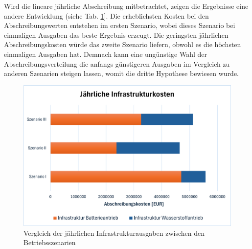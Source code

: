 Wird die lineare jährliche Abschreibung mitbetrachtet, 
zeigen die Ergebnisse eine andere Entwicklung (siehe Tab. \ref{res_abschr_betriebsszenarien}]. 
Die erheblichsten Kosten bei den Abschreibungswerten entstehen im ersten Szenario, 
wobei dieses Szenario bei einmaligen Ausgaben das beste Ergebnis erzeugt.
Die geringsten jährlichen Abschreibungskosten würde das zweite Szenario liefern, 
obwohl es die höchsten einmaligen Ausgaben hat. 
Demnach kann eine ungünstige Wahl der Abschreibungsverteilung die anfangs günstigeren Ausgaben 
im Vergleich zu anderen Szenarien steigen lassen, womit die dritte Hypothese bewiesen wurde.\\
%
\begin{figure}[h]
	\centering
	\includegraphics[width=0.8\linewidth]{Bilder/infr_abschreibung.png}
	\caption[Vergleich der jährlichen Infrastrukturausgaben zwischen den Betriebsszenarien]{Vergleich der jährlichen Infrastrukturausgaben zwischen den Betriebsszenarien}
	\label{res_abschr_betriebsszenarien}
\end{figure}


